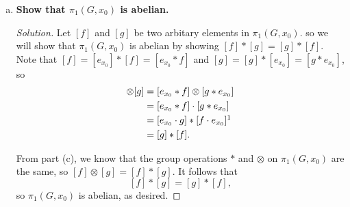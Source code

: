 \documentclass[11pt]{article}
\newenvironment{solution}
  {\renewcommand\qedsymbol{$\blacksquare$}\begin{proof}[Solution]}
  {\end{proof}}
\begin{document}
\begin{enumerate}[c)]
    \item \textbf{Show that $\pi_1(G, x_0)$ is abelian.}
    \begin{solution}
    Let $[f]$ and $[g]$ be two arbitary elements in $\pi_1(G, x_0)$. 
    so we will show that $\pi_1(G, x_0)$ is abelian by showing $[f] * [g] = [g] * [f]$. \\
    
    Note that $[f] = [e_{x_0}] * [f] = [e_{x_0} * f]$ and $[g] = [g] * [e_{x_0}] = [g * e_{x_0}]$, so
    \begin{align*}
        [f] \otimes [g] &= [e_{x_0} * f] \otimes [g * e_{x_0}] \\
        &= [e_{x_0} * f] \cdot [g * e_{x_0}] \\
        &= [e_{x_0} \cdot g] * [f \cdot e_{x_0}] \footnotemark \\
        &= [g] * [f].
    \end{align*}
    
    From part (c), we know that the group operations $*$ and $\otimes$ on $\pi_1(G, x_0)$ are the same, so $[f] \otimes [g] = [f] * [g]$. It follows that
    \[
        [f] * [g] = [g] * [f],
    \]
    so $\pi_1(G, x_0)$ is abelian, as desired.
    \end{solution}
\end{enumerate}
\end{document}
